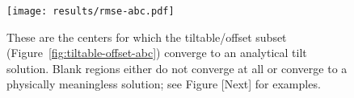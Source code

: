 \begin{figure}
    \texttt{[image: results/rmse-abc.pdf]}%
    \caption[Centers by analytical convergence]{These are the centers for which the tiltable/offset subset (Figure~\ref{fig:tiltable-offset-abc}) converge to an analytical tilt solution. Blank regions either do not converge at all or converge to a physically meaningless solution; see Figure [Next] for examples.}%
    \label{fig:rmse-abc}
\end{figure}